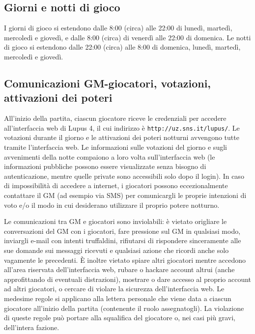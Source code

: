\documentclass[a4paper,10pt]{article}
\begin{document}
\subsection{Giorni e notti di gioco}

I giorni di gioco si estendono dalle 8:00 (circa) alle 22:00 di lunedì, martedì, mercoledì e giovedì, e dalle 8:00 (circa) di venerdì alle 22:00 di domenica.
Le notti di gioco si estendono dalle 22:00 (circa) alle 8:00 di domenica, lunedì, martedì, mercoledì e giovedì.



\subsection{Comunicazioni GM-giocatori, votazioni, attivazioni dei poteri}

All'inizio della partita, ciascun giocatore riceve le credenziali per accedere all'interfaccia web di Lupus 4, il cui indirizzo è \verb|http://uz.sns.it/lupus/|.
Le votazioni durante il giorno e le attivazioni dei poteri notturni avvengono tutte tramite l'interfaccia web. Le informazioni sulle votazioni del giorno e sugli avvenimenti della notte compaiono a loro volta sull'interfaccia web (le informazioni pubbliche possono essere visualizzate senza bisogno di autenticazione, mentre quelle private sono accessibili solo dopo il login).
In caso di impossibilità di accedere a internet, i giocatori possono eccezionalmente contattare il GM (ad esempio via SMS) per comunicargli le proprie intenzioni di voto e/o il modo in cui desiderano utilizzare il proprio potere notturno.

Le comunicazioni tra GM e giocatori sono inviolabili: è vietato origliare le conversazioni del GM con i giocatori, fare pressione sul GM in qualsiasi modo, inviargli e-mail con intenti truffaldini, rifiutarsi di rispondere sinceramente alle sue domande sui messaggi ricevuti e qualsiasi azione che ricordi anche solo vagamente le precedenti.
È inoltre vietato spiare altri giocatori mentre accedono all'area riservata dell'interfaccia web, rubare o hackare account altrui (anche approfittando di eventuali distrazioni), mostrare o dare accesso al proprio account ad altri giocatori, o cercare di violare la sicurezza dell'interfaccia web.
Le medesime regole si applicano alla lettera personale che viene data a ciascun giocatore all'inizio della partita (contenente il ruolo assegnatogli).
La violazione di queste regole può portare alla squalifica del giocatore o, nei casi più gravi, dell'intera fazione.
\end{document}
